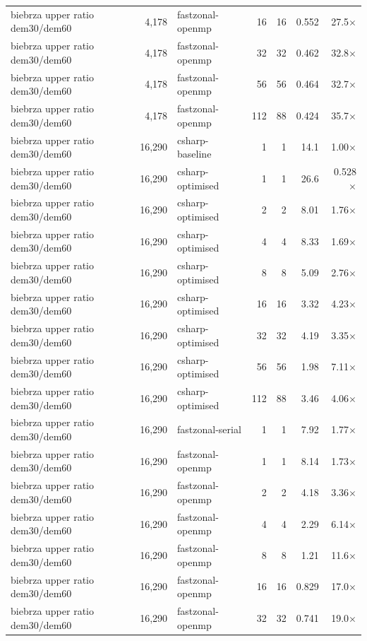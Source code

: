 \begin{tabular}{lrlrrrr}
biebrza upper ratio dem30/dem60 & 4,178 & fastzonal-openmp & 16 & 16 & 0.552 & 27.5$\times$ \\
biebrza upper ratio dem30/dem60 & 4,178 & fastzonal-openmp & 32 & 32 & 0.462 & 32.8$\times$ \\
biebrza upper ratio dem30/dem60 & 4,178 & fastzonal-openmp & 56 & 56 & 0.464 & 32.7$\times$ \\
biebrza upper ratio dem30/dem60 & 4,178 & fastzonal-openmp & 112 & 88 & 0.424 & 35.7$\times$ \\
biebrza upper ratio dem30/dem60 & 16,290 & csharp-baseline & 1 & 1 & 14.1 & 1.00$\times$ \\
biebrza upper ratio dem30/dem60 & 16,290 & csharp-optimised & 1 & 1 & 26.6 & 0.528$\times$ \\
biebrza upper ratio dem30/dem60 & 16,290 & csharp-optimised & 2 & 2 & 8.01 & 1.76$\times$ \\
biebrza upper ratio dem30/dem60 & 16,290 & csharp-optimised & 4 & 4 & 8.33 & 1.69$\times$ \\
biebrza upper ratio dem30/dem60 & 16,290 & csharp-optimised & 8 & 8 & 5.09 & 2.76$\times$ \\
biebrza upper ratio dem30/dem60 & 16,290 & csharp-optimised & 16 & 16 & 3.32 & 4.23$\times$ \\
biebrza upper ratio dem30/dem60 & 16,290 & csharp-optimised & 32 & 32 & 4.19 & 3.35$\times$ \\
biebrza upper ratio dem30/dem60 & 16,290 & csharp-optimised & 56 & 56 & 1.98 & 7.11$\times$ \\
biebrza upper ratio dem30/dem60 & 16,290 & csharp-optimised & 112 & 88 & 3.46 & 4.06$\times$ \\
biebrza upper ratio dem30/dem60 & 16,290 & fastzonal-serial & 1 & 1 & 7.92 & 1.77$\times$ \\
biebrza upper ratio dem30/dem60 & 16,290 & fastzonal-openmp & 1 & 1 & 8.14 & 1.73$\times$ \\
biebrza upper ratio dem30/dem60 & 16,290 & fastzonal-openmp & 2 & 2 & 4.18 & 3.36$\times$ \\
biebrza upper ratio dem30/dem60 & 16,290 & fastzonal-openmp & 4 & 4 & 2.29 & 6.14$\times$ \\
biebrza upper ratio dem30/dem60 & 16,290 & fastzonal-openmp & 8 & 8 & 1.21 & 11.6$\times$ \\
biebrza upper ratio dem30/dem60 & 16,290 & fastzonal-openmp & 16 & 16 & 0.829 & 17.0$\times$ \\
biebrza upper ratio dem30/dem60 & 16,290 & fastzonal-openmp & 32 & 32 & 0.741 & 19.0$\times$ \\

\end{tabular}
